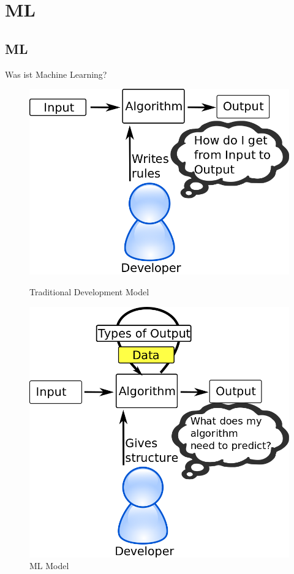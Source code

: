 \documentclass{beamer}
\begin{document}
\section{ML}
\subsection{ML}
\begin{frame}{Was ist Machine Learning?}
    \begin{figure}[ht]
        \begin{minipage}[b]{0.45\linewidth}
            \centering
            \includegraphics[width=\textwidth]{../images/traditional-model.png}
            \caption{Traditional Development Model}
        \end{minipage}
        \hspace{0.5cm}
        \begin{minipage}[b]{0.45\linewidth}
            \centering
            \includegraphics[width=\textwidth]{../images/ml-model.png}
            \caption{ML Model}
        \end{minipage}
    \end{figure}
\end{frame}
\end{document}
